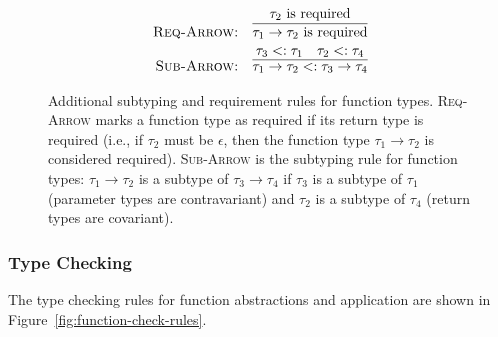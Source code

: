 \documentclass[10pt,conference]{IEEEtran}
\newcommand{\arrowt}[2]{\ensuremath{{#1}\rightarrow{#2}}}
\newcommand{\required}[1]{\ensuremath{#1\text{ is required}}}
\begin{document}
\begin{figure}[ht]
\centering
\begin{framed}
\begin{align*}
\text{\textsc{Req-Arrow:}} &\quad \infer{\required{\arrowt{\tau_1}{\tau_2}}}{\required{\tau_2}} \\
\text{\textsc{Sub-Arrow:}} &\quad \infer{\arrowt{\tau_1}{\tau_2} <: \arrowt{\tau_3}{\tau_4}}{\tau_3 <: \tau_1 \quad \tau_2 <: \tau_4}
\end{align*}
\end{framed}
\caption{Additional subtyping and requirement rules for function types. \textsc{Req-Arrow} marks a function type as required if its return type is required (i.e., if $\tau_2$ must be $\epsilon$, then the function type $\tau_1 \to \tau_2$ is considered required). \textsc{Sub-Arrow} is the subtyping rule for function types: $\tau_1 \to \tau_2$ is a subtype of $\tau_3 \to \tau_4$ if $\tau_3$ is a subtype of $\tau_1$ (parameter types are contravariant) and $\tau_2$ is a subtype of $\tau_4$ (return types are covariant).}
\label{fig:function-subtype-rules}
\end{figure}

\subsubsection{Type Checking}
The type checking rules for function abstractions and application are shown in Figure~\ref{fig:function-check-rules}.
\end{document}

